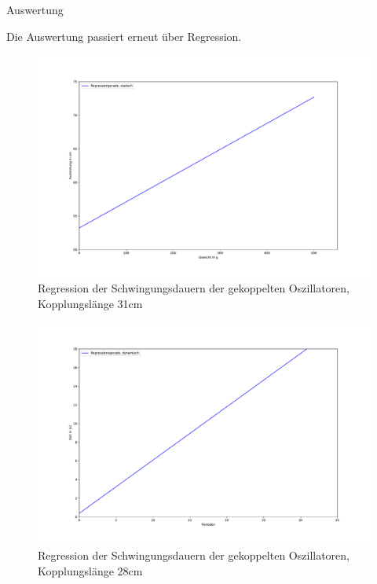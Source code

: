 Auswertung

Die Auswertung passiert erneut über Regression.


\begin{figure}[h!]{}
    \begin{center}
        \includegraphics[scale = 0.4]{./Pendel/Protokoll/fig/Federkonstante_1.pdf}
        \caption{Regression der Schwingungsdauern der gekoppelten Oszillatoren,  Kopplungslänge 31cm}
        \label{fig:Schwingungsdauern-gekoppelte-Oszillatoren1}
    \end{center}
\end{figure}

\begin{figure}[h!]{}
    \begin{center}
        \includegraphics[scale=0.4]{./Pendel/Protokoll/fig/Federkonstante_2.pdf}
        \caption{Regression der Schwingungsdauern der gekoppelten Oszillatoren, Kopplungslänge 28cm}
        \label{fig:Schwingungsdauern-gekoppelte-Oszillatoren2}
    \end{center}
\end{figure}

